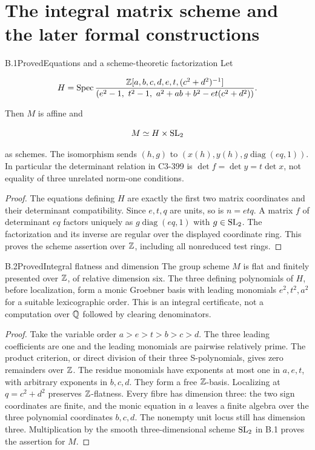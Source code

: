 \section{The integral matrix scheme and the later formal constructions}

\begin{statement}{B.1}{Proved}{Equations and a scheme-theoretic factorization}
Let

$$
H=\operatorname{Spec}
 \frac{\mathbb Z[a,b,c,d,e,t,(c^2+d^2)^{-1}]}
 {(e^2-1,\ t^2-1,\ a^2+ab+b^2-et(c^2+d^2))}.
$$

Then $M$ is affine and

$$
M\simeq H\times\operatorname{SL}_2
$$

as schemes. The isomorphism sends $(h,g)$ to
$(x(h),y(h),g\operatorname{diag}(eq,1))$.
In particular the determinant relation in C3-399 is
$\det f=\det y=t\det x$, not equality of three unrelated
norm-one conditions.
\end{statement}
\begin{proof}
The equations defining $H$ are exactly the first two matrix
coordinates and their determinant compatibility. Since
$e,t,q$ are units, so is $n=etq$.
A matrix $f$ of determinant $eq$ factors uniquely as
$g\operatorname{diag}(eq,1)$ with $g\in\operatorname{SL}_2$.
The factorization and its inverse are regular over the displayed
coordinate ring. This proves the scheme assertion over $\mathbb Z$,
including all nonreduced test rings.
\end{proof}

\begin{statement}{B.2}{Proved}{Integral flatness and dimension}
The group scheme $M$ is flat and finitely presented over $\mathbb Z$,
of relative dimension six. The three defining polynomials of
$H$, before localization, form a monic Groebner basis with
leading monomials $e^2,t^2,a^2$ for a suitable lexicographic
order. This is an integral certificate, not a computation
over $\mathbb Q$ followed by clearing denominators.
\end{statement}
\begin{proof}
Take the variable order $a>e>t>b>c>d$.
The three leading coefficients are one and the leading
monomials are pairwise relatively prime. The product criterion,
or direct division of their three S-polynomials, gives zero
remainders over $\mathbb Z$. The residue monomials have exponents
at most one in $a,e,t$, with arbitrary exponents in $b,c,d$.
They form a free $\mathbb Z$-basis. Localizing at $q=c^2+d^2$
preserves $\mathbb Z$-flatness.
Every fibre has dimension three: the two sign coordinates
are finite, and the monic equation in $a$ leaves a finite
algebra over the three polynomial coordinates $b,c,d$.
The nonempty unit locus still has dimension three.
Multiplication by the smooth three-dimensional scheme $\operatorname{SL}_2$
in B.1 proves the assertion for $M$.
\end{proof}

